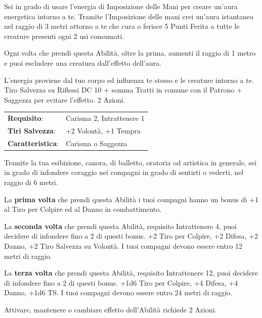 \begin{multicols}{2}
Sei in grado di usare l'energia di Imposizione delle Mani per creare un'aura energetica intorno a te.
Tramite l'Imposizione delle mani crei un'aura istantanea nel raggio di 3 metri attorno a te che cura o ferisce 5 Punti Ferita a tutte le creature presenti ogni 2 usi consumati.

Ogni volta che prendi questa Abilità, oltre la prima, aumenti il raggio di 1 metro e puoi escludere una creatura dall'effetto dell'aura.

L'energia proviene dal tuo corpo ed influenza te stesso e le creature intorno a te. Tiro Salvezza su Riflessi DC 10 + somma Tratti in comune con il Patrono + Saggezza per evitare l'effetto.  2 Azioni.

%

\noindent\begin{tabularx}{\linewidth}{>{\raggedright\arraybackslash}p{2.5cm}X}
\rowcolor{gray!20}\textbf{Requisito}: & Carisma 2, Intrattenere 1\\
\textbf{Tiri Salvezza}: & +2 Volontà, +1 Tempra\\
\rowcolor{gray!20}\textbf{Caratteristica}: & Carisma o Saggezza\\
\end{tabularx}\smallskip

Tramite la tua esibizione, canora, di balletto, oratoria od artistica in generale, sei in grado di infondere coraggio nei compagni in grado di sentirti o vederti, nel raggio di 6 metri.

La \textbf{prima volta} che prendi questa Abilità i tuoi compagni hanno un bonus di +1 al Tiro per Colpire ed al Danno in combattimento.

La \textbf{seconda volta} che prendi questa Abilità, requisito Intrattenere 4, puoi decidere di infondere fino a 2 di questi bonus. +2 Tiro per Colpire, +2 Difesa, +2 Danno, +2 Tiro Salvezza su Volontà. I tuoi compagni devono essere entro 12 metri di raggio.

La \textbf{terza volta} che prendi questa Abilità, requisito Intrattenere 12, puoi decidere di infondere fino a 2 di questi bonus. +1d6 Tiro per Colpire, +4 Difesa, +4 Danno, +1d6 TS. I tuoi compagni devono essere entro 24 metri di raggio.

Attivare, mantenere o cambiare effetto dell'Abilità richiede 2 Azioni.


\end{multicols}
